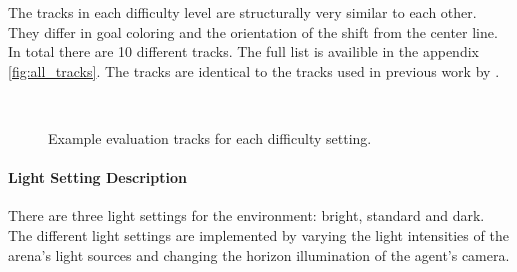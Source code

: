 The tracks in each difficulty level are structurally very similar to each other. They differ in goal coloring and the orientation of the shift from the center line. In total there are 10 different tracks. The full list is availible in the appendix \ref{fig:all_tracks}. The tracks are identical to the tracks used in previous work by \textcite{maximilian}.

\begin{figure}
    \centering
    \qquad
    \qquad
    \\
    \caption{Example evaluation tracks for each difficulty setting.}
    \label{fig:track_difficulty_settings}
\end{figure}

\paragraph{Light Setting Description}
There are three light settings for the environment: bright, standard and dark. The different light settings are implemented by varying the light intensities of the arena's light sources and changing the horizon illumination of the agent's camera.

